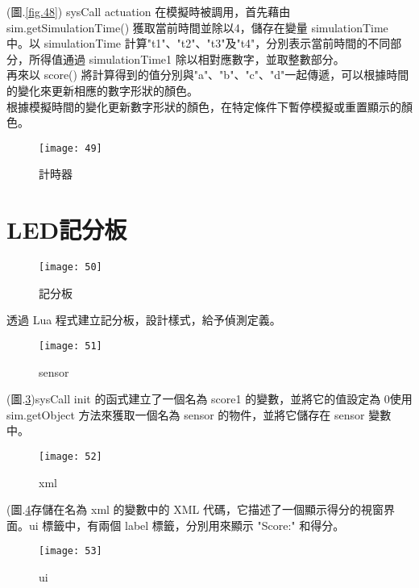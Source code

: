 (圖.\ref{fig.48}) sysCall actuation 在模擬時被調用，首先藉由 sim.getSimulationTime() 獲取當前時間並除以4，儲存在變量 simulationTime 中。以 simulationTime 計算"t1"、"t2"、"t3"及"t4"，分別表示當前時間的不同部分，所得值通過 simulationTime1 除以相對應數字，並取整數部分。\\
再來以 score() 將計算得到的值分別與"a"、"b"、"c"、"d"一起傳遞，可以根據時間的變化來更新相應的數字形狀的顏色。\\
  根據模擬時間的變化更新數字形狀的顏色，在特定條件下暫停模擬或重置顯示的顏色。\\
\begin{figure}[hbt!]
\begin{center}
\texttt{[image: 49]}
\caption{\Large 計時器}\label{fig.49}
\end{center}
\end{figure}
\newpage
\section{LED記分板}
\begin{figure}[hbt!]
\begin{center}
\texttt{[image: 50]}
\caption{\Large 記分板}\label{50}
\end{center}
\end{figure}
透過 Lua 程式建立記分板，設計樣式，給予偵測定義。\\
\newpage
\begin{figure}[hbt!]
\begin{center}
\texttt{[image: 51]}
\caption{\Large sensor}\label{fig.51}
\end{center}
\end{figure}

(圖.\ref{fig.51})sysCall init 的函式建立了一個名為 score1 的變數，並將它的值設定為 0使用 sim.getObject 方法來獲取一個名為 sensor 的物件，並將它儲存在 sensor 變數中。\\
\begin{figure}[hbt!]
\begin{center}
\texttt{[image: 52]}
\caption{\Large xml}\label{fig.52}
\end{center}
\end{figure}

(圖.\ref{fig.52}存儲在名為 xml 的變數中的 XML 代碼，它描述了一個顯示得分的視窗界面。ui 標籤中，有兩個 label 標籤，分別用來顯示 "Score:" 和得分。\\
\begin{figure}[hbt!]
\begin{center}
\texttt{[image: 53]}
\caption{\Large ui}\label{fig.53}
\end{center}
\end{figure}

